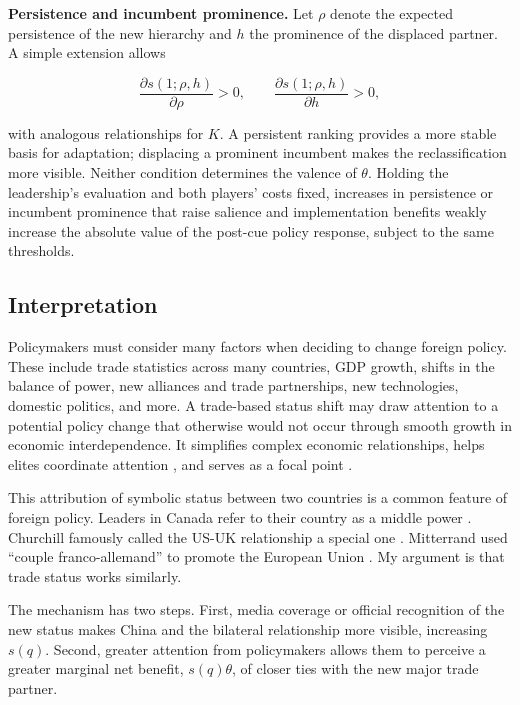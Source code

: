 \documentclass[referee,pdflatex,sn-basic]{sn-jnl}
\theoremstyle{thmstylethree}
\begin{document}
\medskip

\noindent\textbf{Persistence and incumbent prominence.}
Let \(\rho\) denote the expected persistence of the new hierarchy and \(h\) the prominence of the displaced partner. A simple extension allows

\[
\frac{\partial s(1;\rho,h)}{\partial\rho}>0,
\qquad
\frac{\partial s(1;\rho,h)}{\partial h}>0,
\]

with analogous relationships for \(K\). A persistent ranking provides a more stable basis for adaptation; displacing a prominent incumbent makes the reclassification more visible. Neither condition determines the valence of \(\theta\). Holding the leadership's evaluation and both players' costs fixed, increases in persistence or incumbent prominence that raise salience and implementation benefits weakly increase the absolute value of the post-cue policy response, subject to the same thresholds.

\subsection{Interpretation}\label{interpretation}

Policymakers must consider many factors when deciding to change foreign policy. These include trade statistics across many countries, GDP growth, shifts in the balance of power, new alliances and trade partnerships, new technologies, domestic politics, and more. A trade-based status shift may draw attention to a potential policy change that otherwise would not occur through smooth growth in economic interdependence. It simplifies complex economic relationships, helps elites coordinate attention \citep{bordalo_etal2022, conlon2023, enke2024, graeber_etal2025}, and serves as a focal point \citep{schelling1960}.

This attribution of symbolic status between two countries is a common feature of foreign policy. Leaders in Canada refer to their country as a middle power \citep{chapnick1999}. Churchill famously called the US-UK relationship a special one \citep{reynolds1985}. Mitterrand used ``couple franco-allemand'' to promote the European Union \citep{krotz_schild2013}. My argument is that trade status works similarly.

The mechanism has two steps. First, media coverage or official recognition of the new status makes China and the bilateral relationship more visible, increasing \(s(q)\). Second, greater attention from policymakers allows them to perceive a greater marginal net benefit, \(s(q)\theta\), of closer ties with the new major trade partner.
\end{document}
